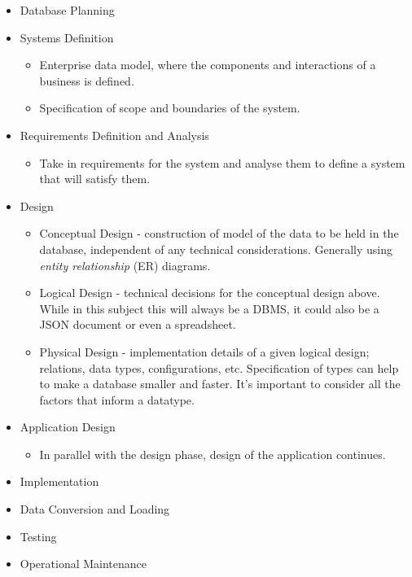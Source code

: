 \documentclass[12pt]{report}
\begin{document}
\begin{flushleft}
\begin{itemize}
    \item Database Planning
    \item Systems Definition
        \begin{itemize}
            \item Enterprise data model, where the components and interactions
                of a business is defined. 
            \item Specification of scope and boundaries of the system. 
        \end{itemize}
    \item Requirements Definition and Analysis
        \begin{itemize}
            \item Take in requirements for the system and analyse them to define
                a system that will satisfy them.
        \end{itemize}
    \item Design
        \begin{itemize}
            \item Conceptual Design - construction of model of the data to be
                held in the database, independent of any technical
                considerations. Generally using \textit{entity relationship}
                (ER) diagrams.
            \item Logical Design - technical decisions for the conceptual
                design above. While in this subject this will always be a DBMS,
                it could also be a JSON document or even a spreadsheet.
            \item Physical Design - implementation details of a given logical
                design; relations, data types, configurations, etc.
                Specification of types can help to make a database smaller and
                faster. It's important to consider all the factors that inform
                a datatype.
        \end{itemize}
    \item Application Design
        \begin{itemize}
            \item In parallel with the design phase, design of the application
                continues.
        \end{itemize}
    \item Implementation
    \item Data Conversion and Loading
    \item Testing
    \item Operational Maintenance
\end{itemize}

\end{flushleft}
\end{document}
